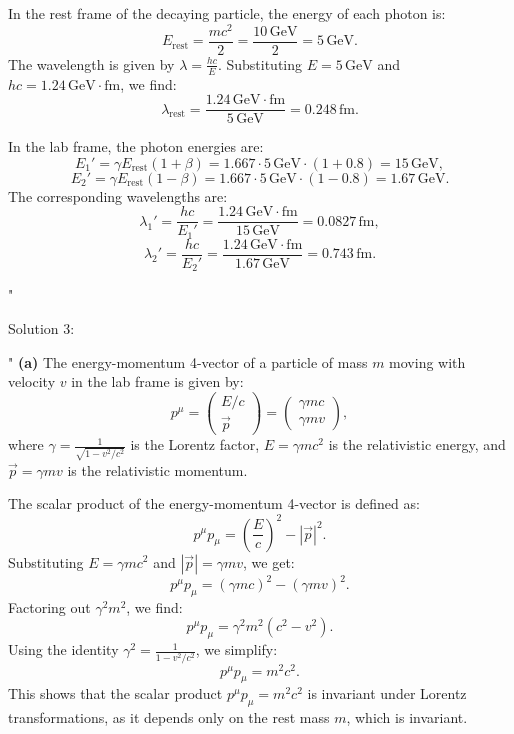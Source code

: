 In the rest frame of the decaying particle, the energy of each photon is:
\[
E_{\text{rest}} = \frac{mc^2}{2} = \frac{10 \, \text{GeV}}{2} = 5 \, \text{GeV}.
\]
The wavelength is given by \(\lambda = \frac{hc}{E}\). Substituting \(E = 5 \, \text{GeV}\) and \(hc = 1.24 \, \text{GeV} \cdot \text{fm}\), we find:
\[
\lambda_{\text{rest}} = \frac{1.24 \, \text{GeV} \cdot \text{fm}}{5 \, \text{GeV}} = 0.248 \, \text{fm}.
\]

In the lab frame, the photon energies are:
\[
E_1' = \gamma E_{\text{rest}}(1 + \beta) = 1.667 \cdot 5 \, \text{GeV} \cdot (1 + 0.8) = 15 \, \text{GeV},
\]
\[
E_2' = \gamma E_{\text{rest}}(1 - \beta) = 1.667 \cdot 5 \, \text{GeV} \cdot (1 - 0.8) = 1.67 \, \text{GeV}.
\]
The corresponding wavelengths are:
\[
\lambda_1' = \frac{hc}{E_1'} = \frac{1.24 \, \text{GeV} \cdot \text{fm}}{15 \, \text{GeV}} = 0.0827 \, \text{fm},
\]
\[
\lambda_2' = \frac{hc}{E_2'} = \frac{1.24 \, \text{GeV} \cdot \text{fm}}{1.67 \, \text{GeV}} = 0.743 \, \text{fm}.
\]

"

Solution 3:

"
\textbf{(a)} The energy-momentum 4-vector of a particle of mass \(m\) moving with velocity \(v\) in the lab frame is given by:
\[
p^\mu = \begin{pmatrix} E/c \\ \vec{p} \end{pmatrix} = \begin{pmatrix} \gamma mc \\ \gamma mv \end{pmatrix},
\]
where \(\gamma = \frac{1}{\sqrt{1-v^2/c^2}}\) is the Lorentz factor, \(E = \gamma mc^2\) is the relativistic energy, and \(\vec{p} = \gamma mv\) is the relativistic momentum.

The scalar product of the energy-momentum 4-vector is defined as:
\[
p^\mu p_\mu = \left(\frac{E}{c}\right)^2 - |\vec{p}|^2.
\]
Substituting \(E = \gamma mc^2\) and \(|\vec{p}| = \gamma mv\), we get:
\[
p^\mu p_\mu = \left(\gamma mc\right)^2 - \left(\gamma mv\right)^2.
\]
Factoring out \(\gamma^2m^2\), we find:
\[
p^\mu p_\mu = \gamma^2m^2 \left(c^2 - v^2\right).
\]
Using the identity \(\gamma^2 = \frac{1}{1-v^2/c^2}\), we simplify:
\[
p^\mu p_\mu = m^2c^2.
\]
This shows that the scalar product \(p^\mu p_\mu = m^2c^2\) is invariant under Lorentz transformations, as it depends only on the rest mass \(m\), which is invariant.

